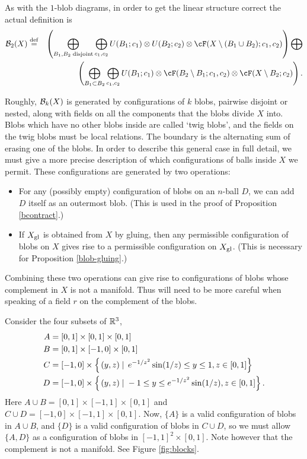 As with the $1$-blob diagrams, in order to get the linear structure correct the actual definition is 
\begin{eqnarray*}
	\bc_2(X) & \deq &
	\left( 
		\bigoplus_{B_1, B_2\; \text{disjoint}} \bigoplus_{c_1, c_2}
			U(B_1; c_1) \otimes U(B_2; c_2) \otimes \cF(X\setmin (B_1\cup B_2); c_1, c_2)
	\right)  \bigoplus \\
	&& \quad\quad  \left( 
		\bigoplus_{B_1 \subset B_2} \bigoplus_{c_1, c_2}
			U(B_1; c_1) \otimes \cF(B_2 \setmin B_1; c_1, c_2) \tensor \cF(X \setminus B_2; c_2)
	\right) .
\end{eqnarray*}

\medskip

Roughly, ${\mathcal B}_k(X)$ is generated by configurations of $k$ blobs, pairwise disjoint or nested, 
along with fields on all the components that the blobs divide $X$ into. 
Blobs which have no other blobs inside are called `twig blobs', 
and the fields on the twig blobs must be local relations.
The boundary is the alternating sum of erasing one of the blobs.
In order to describe this general case in full detail, we must give a more precise description of
which configurations of balls inside $X$ we permit.
These configurations are generated by two operations:
\begin{itemize}
\item For any (possibly empty) configuration of blobs on an $n$-ball $D$, we can add
$D$ itself as an outermost blob.
(This is used in the proof of Proposition \ref{bcontract}.)
\item If $X_\mathrm{gl}$ is obtained from $X$ by gluing, then any permissible configuration of blobs
on $X$ gives rise to a permissible configuration on $X_\mathrm{gl}$.
(This is necessary for Proposition \ref{blob-gluing}.)
\end{itemize}
Combining these two operations can give rise to configurations of blobs whose complement in $X$ is not
a manifold.
Thus will need to be more careful when speaking of a field $r$ on the complement of the blobs.

\begin{example} \label{sin1x-example}
Consider the four subsets of $\mathbb R^3$,
\begin{align*}
A & = [0,1] \times [0,1] \times [0,1] \\
B & = [0,1] \times [-1,0] \times [0,1] \\
C & = [-1,0] \times \left\{ \left. (y,z) \;\right| \; e^{-1/z^2} \sin(1/z) \leq y \leq 1, z \in [0,1] \right\} \\
D & = [-1,0] \times \left\{ \left. (y,z) \;\right| \; -1 \leq y \leq e^{-1/z^2} \sin(1/z), z \in [0,1] \right\}.
\end{align*}
Here $A \cup B = [0,1] \times [-1,1] \times [0,1]$ and $C \cup D = [-1,0] \times [-1,1] \times [0,1]$. 
Now, $\{A\}$ is a valid configuration of blobs in $A \cup B$, 
and $\{D\}$ is a valid configuration of blobs in $C \cup D$, 
so we must allow $\{A, D\}$ as a configuration of blobs in $[-1,1]^2 \times [0,1]$. 
Note however that the complement is not a manifold. See Figure \ref{fig:blocks}.
\end{example}

